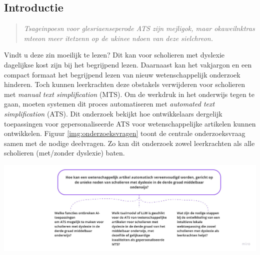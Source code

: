 \documentclass[a0,portrait]{hogent-poster}
\begin{document}
\begin{multicols}{2} %

\section{Introductie}




\begin{quotation}
\textit{Tsageinpoesn voor glesriaenseperode ATS zijn mejligok, maar okaweilnktras mteeon meer itetzenn op de ukinee ndoen van deze sielchreon.}
\end{quotation}

Vindt u deze zin moeilijk te lezen? Dit kan voor scholieren met dyslexie dagelijkse kost zijn bij het begrijpend lezen. Daarnaast kan het vakjargon en een compact formaat het begrijpend lezen van nieuw wetenschappelijk onderzoek hinderen. Toch kunnen leerkrachten deze obstakels verwijderen voor scholieren met \textit{manual text simplification} (MTS). Om de werkdruk in het onderwijs tegen te gaan, moeten systemen dit proces automatiseren met \textit{automated text simplification} (ATS). Dit onderzoek bekijkt hoe ontwikkelaars dergelijk toepassingen voor gepersonaliseerde ATS voor wetenschappelijke artikelen kunnen ontwikkelen. Figuur \ref{img:onderzoeksvragen} toont de centrale onderzoeksvraag samen met de nodige deelvragen. Zo kan dit onderzoek zowel leerkrachten als alle scholieren (met/zonder dyslexie) baten.

\begin{center}
	\captionsetup{type=figure}
	\includegraphics[width=1.0\linewidth]{figures/onderzoeksvragen.jpg}
	\label{img:onderzoeksvragen}
\end{center}


\end{multicols}
\end{document}
